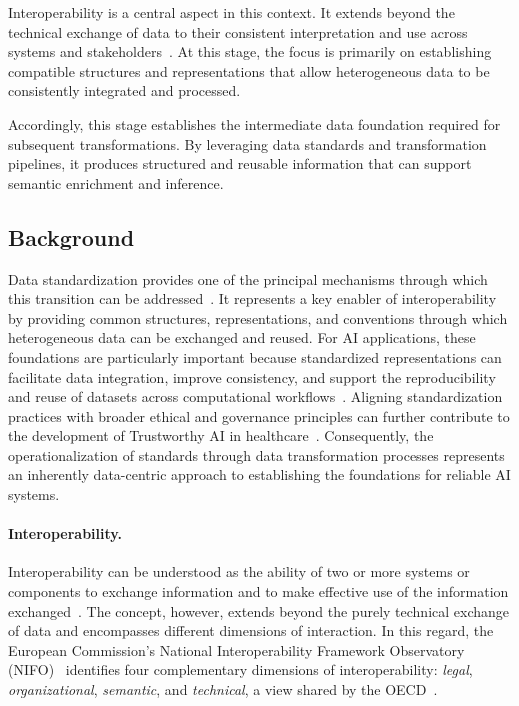 Interoperability is a central aspect in this context. It extends beyond the technical exchange of data to their consistent interpretation and use across systems and stakeholders~\cite{oecd_interoperability_2026}. At this stage, the focus is primarily on establishing compatible structures and representations that allow heterogeneous data to be consistently integrated and processed.

Accordingly, this stage establishes the intermediate data foundation required for subsequent transformations. By leveraging data standards and transformation pipelines, it produces structured and reusable information that can support semantic enrichment and inference.

\subsection{Background}
\label{subsec:harmonization_background}

Data standardization provides one of the principal mechanisms through which this transition can be addressed~\cite{oecd_interoperability_2026}. It represents a key enabler of interoperability by providing common structures, representations, and conventions through which heterogeneous data can be exchanged and reused. For AI applications, these foundations are particularly important because standardized representations can facilitate data integration, improve consistency, and support the reproducibility and reuse of datasets across computational workflows~\cite{oecd_collective_2024}. Aligning standardization practices with broader ethical and governance principles can further contribute to the development of Trustworthy AI in healthcare~\cite{srivastava_promoting_2023}. Consequently, the operationalization of standards through data transformation processes represents an inherently data-centric approach to establishing the foundations for reliable AI systems.

\paragraph{Interoperability.}

Interoperability can be understood as the ability of two or more systems or components to exchange information and to make effective use of the information exchanged~\cite{geraci1991ieee}. The concept, however, extends beyond the purely technical exchange of data and encompasses different dimensions of interaction. In this regard, the European Commission's National Interoperability Framework Observatory (NIFO)~\cite{noauthor_nifo} identifies four complementary dimensions of interoperability: \emph{legal}, \emph{organizational}, \emph{semantic}, and \emph{technical}, a view shared by the OECD~\cite{oecd_interoperability_2026}.


